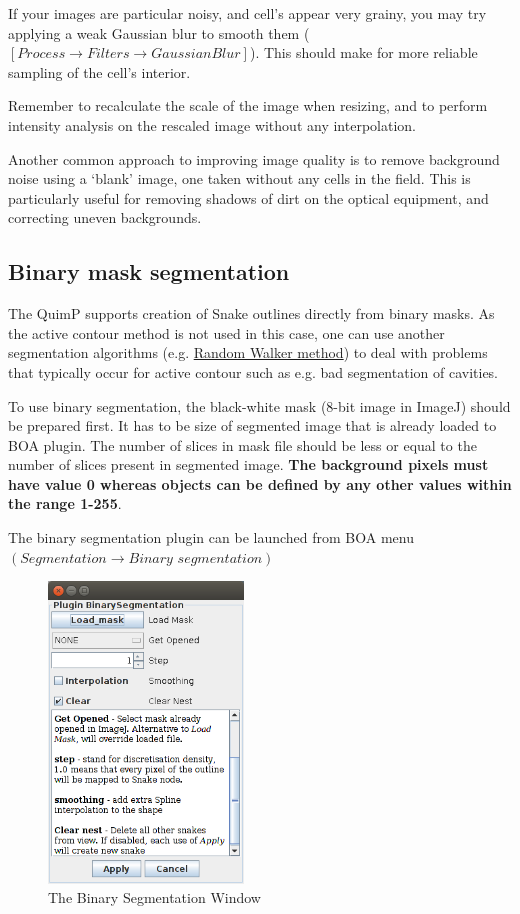 \documentclass[a4paper,12pt]{article}
\begin{document}
If your images are particular noisy, and cell's appear very grainy, you may try applying a weak Gaussian blur to smooth them
($[Process\rightarrow Filters\rightarrow Gaussian Blur]$).  This should make for more reliable sampling of the cell's interior.

Remember to recalculate the scale of the image when resizing, and to perform intensity analysis on the rescaled image without any interpolation.

Another common approach to improving image quality is to remove background noise using a `blank' image, one taken without any
cells in the field.  This is particularly useful for removing shadows of dirt on the optical equipment, and correcting uneven backgrounds.

\subsection{Binary mask segmentation} \label{sec:Binary_seg}
The QuimP supports creation of Snake outlines directly from binary masks. As the active contour method is not used in this case, one can use another segmentation algorithms (e.g. \hyperref[sec:RWSeg]{Random Walker method}) to deal with problems that typically occur for active contour such as e.g. bad segmentation of cavities.

To use binary segmentation, the black-white mask (8-bit image in ImageJ) should be prepared first. It has to be size of segmented image that is already loaded to BOA plugin. The number of slices in mask file should be less or equal to the number of slices present in segmented image. \textbf{The background pixels must have value 0 whereas objects can be defined by any other values within the range 1-255}.

The binary segmentation plugin can be launched from BOA menu $(\textit{Segmentation}\rightarrow \textit{Binary segmentation})$

\begin{figure}[!h]
	\centering
	\includegraphics[height=8cm]{BinarySeg.png}
	\caption{The Binary Segmentation Window}
	\label{BinarySegWindow}
\end{figure}
\end{document}
